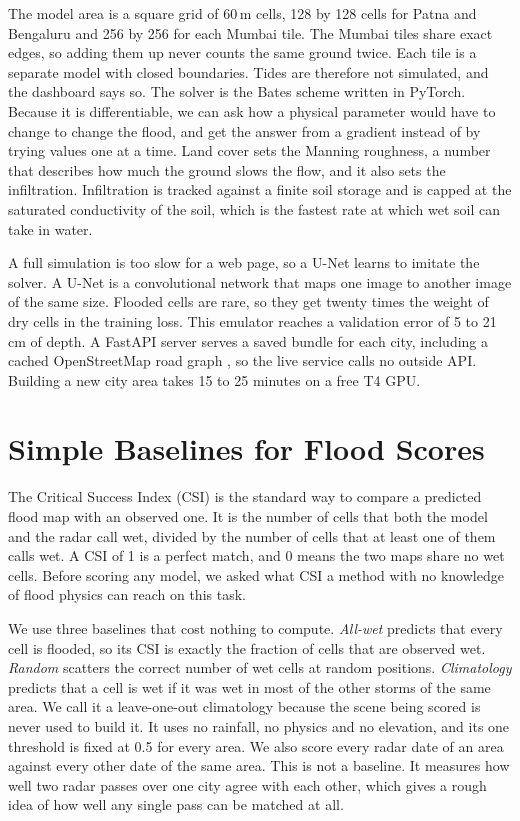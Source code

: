 \documentclass[conference]{IEEEtran}
\begin{document}
The model area is a square grid of 60\,m cells, 128 by 128 cells for Patna and Bengaluru and 256 by
256 for each Mumbai tile. The Mumbai tiles share exact edges, so adding them up never counts the
same ground twice. Each tile is a separate model with closed boundaries. Tides are therefore not
simulated, and the dashboard says so. The solver is the Bates scheme written in PyTorch. Because it
is differentiable, we can ask how a physical parameter would have to change to change the flood,
and get the answer from a gradient instead of by trying values one at a time. Land cover sets the
Manning roughness, a number that describes how much the ground slows the flow, and it also sets the
infiltration. Infiltration is tracked against a finite soil storage and is capped at the saturated
conductivity of the soil, which is the fastest rate at which wet soil can take in water.

A full simulation is too slow for a web page, so a U-Net \cite{ronneberger2015} learns to imitate
the solver. A U-Net is a convolutional network that maps one image to another image of the same
size. Flooded cells are rare, so they get twenty times the weight of dry cells in the training
loss. This emulator reaches a validation error of 5 to 21\,cm of depth. A FastAPI server serves a
saved bundle for each city, including a cached OpenStreetMap road graph \cite{osm}, so the live
service calls no outside API. Building a new city area takes 15 to 25 minutes on a free T4 GPU.

\section{Simple Baselines for Flood Scores}
\label{sec:worth}
The Critical Success Index (CSI) is the standard way to compare a predicted flood map with an
observed one. It is the number of cells that both the model and the radar call wet, divided by the
number of cells that at least one of them calls wet. A CSI of 1 is a perfect match, and 0 means the
two maps share no wet cells. Before scoring any model, we asked what CSI a method with no knowledge
of flood physics can reach on this task.

We use three baselines that cost nothing to compute. \emph{All-wet} predicts that every cell is
flooded, so its CSI is exactly the fraction of cells that are observed wet. \emph{Random} scatters
the correct number of wet cells at random positions. \emph{Climatology} predicts that a cell is wet
if it was wet in most of the other storms of the same area. We call it a leave-one-out climatology
because the scene being scored is never used to build it. It uses no rainfall, no physics and no
elevation, and its one threshold is fixed at 0.5 for every area. We also score every radar date of
an area against every other date of the same area. This is not a baseline. It measures how well two
radar passes over one city agree with each other, which gives a rough idea of how well any single
pass can be matched at all.
\end{document}
